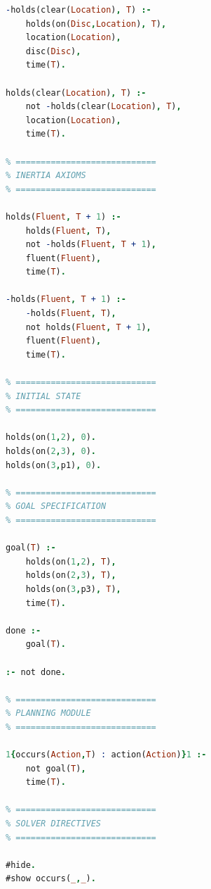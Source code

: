 \documentclass{article}
\begin{document}
\begin{lstlisting}[language=Prolog, caption=Towers of Hanoi Domain Representation in A-Prolog, label=lst:asp-hanoi]
-holds(clear(Location), T) :-
    holds(on(Disc,Location), T),
    location(Location),
    disc(Disc),
    time(T).

holds(clear(Location), T) :-
    not -holds(clear(Location), T),
    location(Location),
    time(T).

% ============================
% INERTIA AXIOMS
% ============================

holds(Fluent, T + 1) :-
    holds(Fluent, T),
    not -holds(Fluent, T + 1),
    fluent(Fluent),
    time(T).

-holds(Fluent, T + 1) :-
    -holds(Fluent, T),
    not holds(Fluent, T + 1),
    fluent(Fluent),
    time(T).

% ============================
% INITIAL STATE
% ============================

holds(on(1,2), 0).
holds(on(2,3), 0).
holds(on(3,p1), 0).

% ============================
% GOAL SPECIFICATION
% ============================

goal(T) :-
    holds(on(1,2), T),
    holds(on(2,3), T),
    holds(on(3,p3), T),
    time(T).

done :-
    goal(T).

:- not done.

% ============================
% PLANNING MODULE
% ============================

1{occurs(Action,T) : action(Action)}1 :-
    not goal(T),
    time(T).

% ============================
% SOLVER DIRECTIVES
% ============================

#hide.
#show occurs(_,_).
\end{lstlisting}
\end{document}
